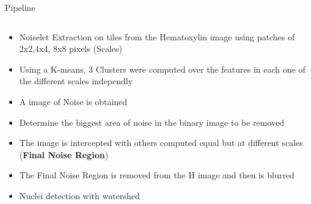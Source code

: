 \documentclass{beamer}
\begin{document}
\begin{frame}{Pipeline}
\begin{columns}

\begin{column}{0.5\textwidth}
    
    \begin{itemize}
        \item<1-> \tiny Noiselet Extraction on tiles from the Hematoxylin image using patches of 2x2,4x4, 8x8 pixels (Scales)
        \item<2-> \tiny Using a K-means, 3 Clusters were computed over the features in each one of the different scales independly
        
        \item<3-> \tiny A image of Noise is obtained
        
        \item<4-> \tiny Determine the biggest area of noise in the binary image to be removed
        
        \item<5-> \tiny The image is intercepted with others computed equal but at different scales (\textbf{Final Noise Region})
        
        \item<6-> \tiny The Final Noise Region is removed from the H image and then is blurred 
         
        \item<8-> \tiny Nuclei detection with watershed
    \end{itemize}


\end{column}
\end{columns}
\end{frame}
\end{document}
